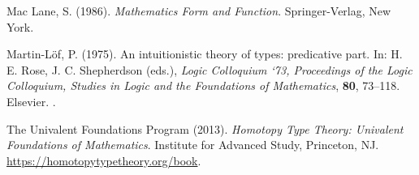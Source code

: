 \documentclass[11pt]{article}
\begin{document}
\begin{thebibliography}{}

Mac Lane, S. (1986).
\newblock \emph{Mathematics Form and Function}.
\newblock Springer-Verlag, New York.

Martin-L\"{o}f, P. (1975).
\newblock An intuitionistic theory of types: predicative part.
\newblock In: H. E. Rose, J. C. Shepherdson (eds.),
    \emph{Logic Colloquium ‘73, Proceedings of the Logic Colloquium,
    Studies in Logic and the Foundations of Mathematics}, \textbf{80}, 73--118.
\newblock Elsevier.
\newblock {}.

The Univalent Foundations Program (2013).
\newblock \emph{Homotopy Type Theory: Univalent Foundations of Mathematics}.
\newblock Institute for Advanced Study, Princeton, NJ.
\newblock \url{https://homotopytypetheory.org/book}.

\end{thebibliography}
\end{document}

